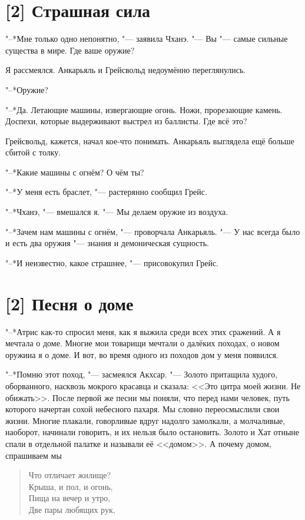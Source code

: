 \section{[2] Страшная сила}

"--*Мне только одно непонятно, "--- заявила Чханэ.
"--- Вы "--- самые сильные существа в мире.
Где ваше оружие?

Я рассмеялся.
Анкарьяль и Грейсвольд недоумённо переглянулись.

"--*Оружие?

"--*Да.
Летающие машины, извергающие огонь.
Ножи, прорезающие камень.
Доспехи, которые выдерживают выстрел из баллисты.
Где всё это?

Грейсвольд, кажется, начал кое-что понимать.
Анкарьяль выглядела ещё больше сбитой с толку.

"--*Какие машины с огнём?
О чём ты?

"--*У меня есть браслет, "--- растерянно сообщил Грейс.

"--*Чханэ, "--- вмешался я.
"--- Мы делаем оружие из воздуха.

"--*Зачем нам машины с огнём, "--- проворчала Анкарьяль.
"--- У нас всегда было и есть два оружия "--- знания и демоническая сущность.

"--*И неизвестно, какое страшнее, "--- присовокупил Грейс.

\section{[2] Песня о доме}

"--*Атрис как-то спросил меня, как я выжила среди всех этих сражений.
А я мечтала о доме.
Многие мои товарищи мечтали о далёких походах, о новом оружии\ldotst а я о доме.
И вот, во время одного из походов дом у меня появился.

"--*Помню этот поход, "--- засмеялся Акхсар.
"--- Золото притащила худого, оборванного, насквозь мокрого красавца и сказала: <<Это цитра моей жизни.
Не обижать>>.
После первой же песни мы поняли, что перед нами человек, путь которого начертан сохой небесного пахаря.
Мы словно переосмыслили свои жизни.
Многие плакали, говорливые вдруг надолго замолкали, а молчаливые, наоборот, начинали говорить, и их нельзя было остановить.
Золото и Хат отныне спали в отдельной палатке и называли её <<домом>>.
А почему домом, спрашиваем мы\ldotsq

\begin{verse}
Что отличает жилище?\\
Крыша, и пол, и огонь,\\
Пища на вечер и утро,\\
Две пары любящих рук,
\end{verse}

